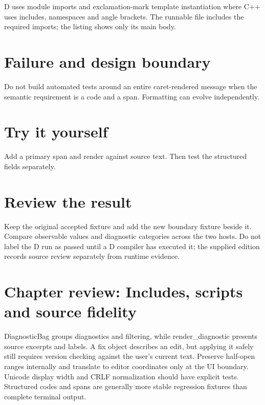 \clearpage
{}
D uses module imports and exclamation-mark template instantiation where C++ uses includes, namespaces and angle brackets. The runnable file includes the required imports; the listing shows only its main body.


\section*{Failure and design boundary}
Do not build automated tests around an entire caret-rendered message when the semantic requirement is a code and a span. Formatting can evolve independently.

\section*{Try it yourself}
Add a primary span and render against source text. Then test the structured fields separately.

\section*{Review the result}
Keep the original accepted fixture and add the new boundary fixture beside it. Compare observable values and diagnostic categories across the two hosts. Do not label the D run as passed until a D compiler has executed it; the supplied edition records source review separately from runtime evidence.

\clearpage
\section*{Chapter review: Includes, scripts and source fidelity}
DiagnosticBag groups diagnostics and filtering, while render\_diagnostic presents source excerpts and labels. A fix object describes an edit, but applying it safely still requires version checking against the user's current text. Preserve half-open ranges internally and translate to editor coordinates only at the UI boundary. Unicode display width and CRLF normalization should have explicit tests. Structured codes and spans are generally more stable regression fixtures than complete terminal output.

